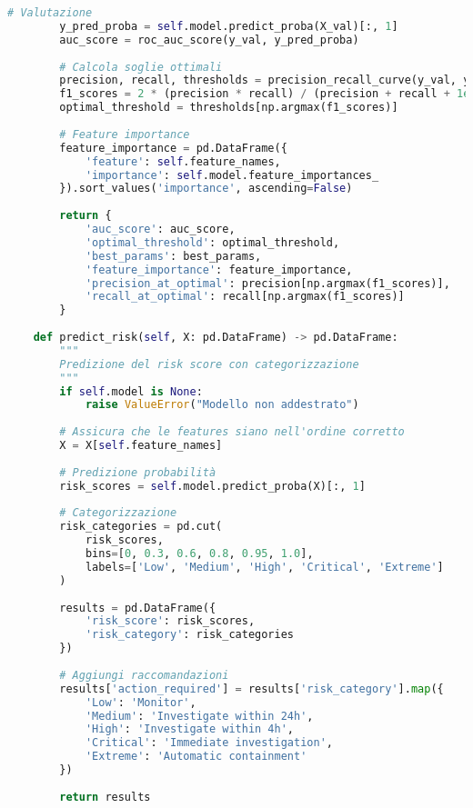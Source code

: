 \begin{lstlisting}[language=Python, caption=Implementazione Risk Scoring adattivo con XGBoost]
        # Valutazione
        y_pred_proba = self.model.predict_proba(X_val)[:, 1]
        auc_score = roc_auc_score(y_val, y_pred_proba)
        
        # Calcola soglie ottimali
        precision, recall, thresholds = precision_recall_curve(y_val, y_pred_proba)
        f1_scores = 2 * (precision * recall) / (precision + recall + 1e-10)
        optimal_threshold = thresholds[np.argmax(f1_scores)]
        
        # Feature importance
        feature_importance = pd.DataFrame({
            'feature': self.feature_names,
            'importance': self.model.feature_importances_
        }).sort_values('importance', ascending=False)
        
        return {
            'auc_score': auc_score,
            'optimal_threshold': optimal_threshold,
            'best_params': best_params,
            'feature_importance': feature_importance,
            'precision_at_optimal': precision[np.argmax(f1_scores)],
            'recall_at_optimal': recall[np.argmax(f1_scores)]
        }
    
    def predict_risk(self, X: pd.DataFrame) -> pd.DataFrame:
        """
        Predizione del risk score con categorizzazione
        """
        if self.model is None:
            raise ValueError("Modello non addestrato")
        
        # Assicura che le features siano nell'ordine corretto
        X = X[self.feature_names]
        
        # Predizione probabilità
        risk_scores = self.model.predict_proba(X)[:, 1]
        
        # Categorizzazione
        risk_categories = pd.cut(
            risk_scores,
            bins=[0, 0.3, 0.6, 0.8, 0.95, 1.0],
            labels=['Low', 'Medium', 'High', 'Critical', 'Extreme']
        )
        
        results = pd.DataFrame({
            'risk_score': risk_scores,
            'risk_category': risk_categories
        })
        
        # Aggiungi raccomandazioni
        results['action_required'] = results['risk_category'].map({
            'Low': 'Monitor',
            'Medium': 'Investigate within 24h',
            'High': 'Investigate within 4h',
            'Critical': 'Immediate investigation',
            'Extreme': 'Automatic containment'
        })
        
        return results
    

\end{lstlisting}
